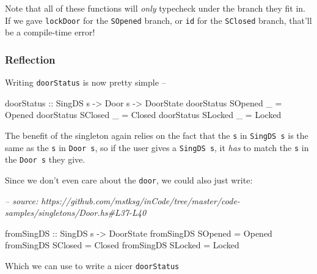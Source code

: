 \documentclass[]{article}
\newenvironment{Shaded}{}{}
\newcommand{\CommentTok}[1]{\textcolor[rgb]{0.38,0.63,0.69}{\textit{#1}}}
\newcommand{\DataTypeTok}[1]{\textcolor[rgb]{0.56,0.13,0.00}{#1}}
\newcommand{\FunctionTok}[1]{\textcolor[rgb]{0.02,0.16,0.49}{#1}}
\newcommand{\NormalTok}[1]{#1}
\newcommand{\OtherTok}[1]{\textcolor[rgb]{0.00,0.44,0.13}{#1}}
\begin{document}
Note that all of these functions will \emph{only} typecheck under the branch
they fit in. If we gave \texttt{lockDoor} for the \texttt{SOpened} branch, or
\texttt{id} for the \texttt{SClosed} branch, that'll be a compile-time error!

\hypertarget{reflection}{%
\subsubsection{Reflection}\label{reflection}}

Writing \texttt{doorStatus} is now pretty simple --

\begin{Shaded}
\begin{Highlighting}[]
\OtherTok{doorStatus ::} \DataTypeTok{SingDS}\NormalTok{ s }\OtherTok{->} \DataTypeTok{Door}\NormalTok{ s }\OtherTok{->} \DataTypeTok{DoorState}
\NormalTok{doorStatus }\DataTypeTok{SOpened}\NormalTok{ _ }\FunctionTok{=} \DataTypeTok{Opened}
\NormalTok{doorStatus }\DataTypeTok{SClosed}\NormalTok{ _ }\FunctionTok{=} \DataTypeTok{Closed}
\NormalTok{doorStatus }\DataTypeTok{SLocked}\NormalTok{ _ }\FunctionTok{=} \DataTypeTok{Locked}
\end{Highlighting}
\end{Shaded}

The benefit of the singleton again relies on the fact that the \texttt{s} in
\texttt{SingDS\ s} is the same as the \texttt{s} in \texttt{Door\ s}, so if the
user gives a \texttt{SingDS\ s}, it \emph{has} to match the \texttt{s} in the
\texttt{Door\ s} they give.

Since we don't even care about the \texttt{door}, we could also just write:

\begin{Shaded}
\begin{Highlighting}[]
\CommentTok{-- source: https://github.com/mstksg/inCode/tree/master/code-samples/singletons/Door.hs#L37-L40}

\OtherTok{fromSingDS ::} \DataTypeTok{SingDS}\NormalTok{ s }\OtherTok{->} \DataTypeTok{DoorState}
\NormalTok{fromSingDS }\DataTypeTok{SOpened} \FunctionTok{=} \DataTypeTok{Opened}
\NormalTok{fromSingDS }\DataTypeTok{SClosed} \FunctionTok{=} \DataTypeTok{Closed}
\NormalTok{fromSingDS }\DataTypeTok{SLocked} \FunctionTok{=} \DataTypeTok{Locked}
\end{Highlighting}
\end{Shaded}

Which we can use to write a nicer \texttt{doorStatus}
\end{document}
